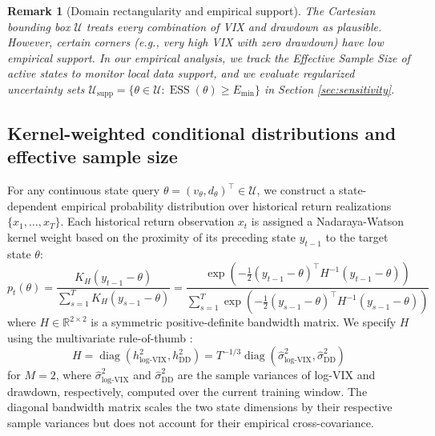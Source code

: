 \documentclass[11pt, a4paper]{article}
\newtheorem{remark}{Remark}
\begin{document}
\begin{remark}[Domain rectangularity and empirical support]
The Cartesian bounding box $\mathcal{U}$ treats every combination of VIX and drawdown as plausible. However, certain corners (e.g., very high VIX with zero drawdown) have low empirical support. In our empirical analysis, we track the Effective Sample Size of active states to monitor local data support, and we evaluate regularized uncertainty sets $\mathcal{U}_{\text{supp}} = \{\theta \in \mathcal{U} : \operatorname{ESS}(\theta) \ge E_{\min}\}$ in Section \ref{sec:sensitivity}.
\end{remark}






\subsection{Kernel-weighted conditional distributions and effective sample size}
For any continuous state query $\theta = (v_\theta, d_\theta)^\top \in \mathcal{U}$, we construct a state-dependent empirical probability distribution over historical return realizations $\{x_1, \dots, x_T\}$. Each historical return observation $x_t$ is assigned a Nadaraya-Watson kernel weight based on the proximity of its preceding state $y_{t-1}$ to the target state $\theta$:
\begin{equation}
    p_t(\theta) = \frac{K_H(y_{t-1} - \theta)}{\sum_{s=1}^{T} K_H(y_{s-1} - \theta)} = \frac{\exp\left(-\frac{1}{2}(y_{t-1} - \theta)^\top H^{-1} (y_{t-1} - \theta)\right)}{\sum_{s=1}^T \exp\left(-\frac{1}{2}(y_{s-1} - \theta)^\top H^{-1} (y_{s-1} - \theta)\right)}
\end{equation}
where $H \in \mathbb{R}^{2 \times 2}$ is a symmetric positive-definite bandwidth matrix. We specify $H$ using the multivariate rule-of-thumb \citep{silverman1986density}:
\begin{equation}
    H = \operatorname{diag}\left(h_{\text{log-VIX}}^2, h_{\text{DD}}^2\right) = T^{-1/3} \operatorname{diag}(\hat{\sigma}_{\text{log-VIX}}^2, \hat{\sigma}_{\text{DD}}^2)
\end{equation}
for $M = 2$, where $\hat{\sigma}^2_{\log\text{-VIX}}$ and $\hat{\sigma}^2_{\text{DD}}$ are the sample variances of log-VIX and drawdown, respectively, computed over the current training window. The diagonal bandwidth matrix scales the two state dimensions by their respective sample variances but does not account for their empirical cross-covariance.
\end{document}
